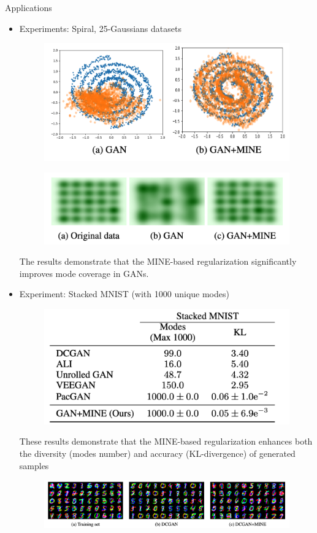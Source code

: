 \documentclass[final]{beamer}
\newlength{\colwidth}
\begin{document}
\begin{frame}[t]
\begin{columns}[t]
\begin{column}{\colwidth}
\begin{block}{Applications}
\begin{itemize}
    \item Experiments: Spiral, 25-Gaussians datasets
    \begin{figure}
        \centering
        \includegraphics[width=0.75\linewidth]{figures/截屏2024-12-31 10.49.13.png}
    \end{figure}
    \begin{figure}
        \centering
        \includegraphics[width=0.95\linewidth]{figures/截屏2024-12-31 10.51.02.png}
    \end{figure}
    The results demonstrate that the MINE-based regularization significantly improves mode coverage in GANs.
    
    \item Experiment: Stacked MNIST (with 1000 unique modes)
    \begin{figure}
        \centering
        \includegraphics[width=0.7\linewidth]{figures/截屏2024-12-31 11.00.18.png}
    \end{figure}
    These results demonstrate that the MINE-based regularization enhances both the diversity (modes number) and accuracy (KL-divergence) of generated samples
    \begin{figure}
        \centering
        \includegraphics[width=1\linewidth]{截屏2024-12-31 11.01.56.png}
    \end{figure}
    

\end{itemize}
\end{block}
\end{column}
\end{columns}
\end{frame}
\end{document}
